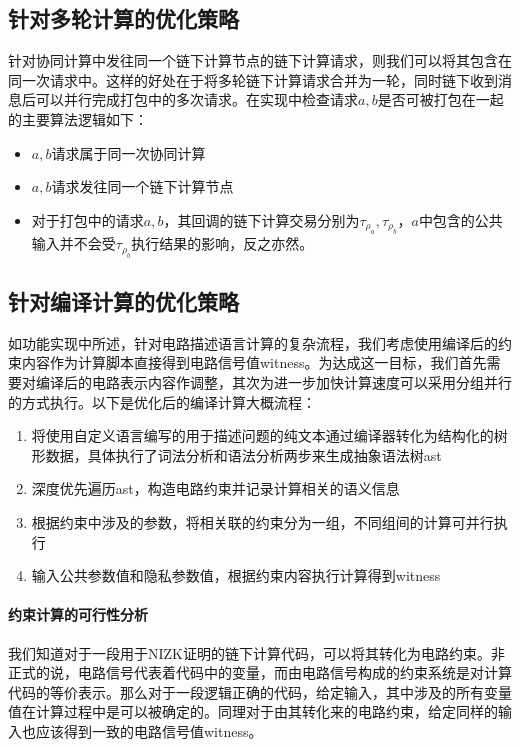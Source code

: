 \subsection{针对多轮计算的优化策略}
针对协同计算中发往同一个链下计算节点的链下计算请求，则我们可以将其包含在同一次请求中。这样的好处在于将多轮链下计算请求合并为一轮，同时链下收到消息后可以并行完成打包中的多次请求。在实现中检查请求$a,b$是否可被打包在一起的主要算法逻辑如下：
\begin{itemize}
    \setlength{\itemsep}{0pt}
    \setlength{\parsep}{0pt}
    \setlength{\parskip}{0pt}
    \item $a,b$请求属于同一次协同计算
    \item $a,b$请求发往同一个链下计算节点
    \item 对于打包中的请求$a, b$，其回调的链下计算交易分别为$\tau_{\rho_a}, \tau_{\rho_b}$，$a$中包含的公共输入并不会受$\tau_{\rho_b}$执行结果的影响，反之亦然。
\end{itemize}

\subsection{针对编译计算的优化策略}
如功能实现中所述，针对电路描述语言计算的复杂流程，我们考虑使用编译后的约束内容作为计算脚本直接得到电路信号值witness。为达成这一目标，我们首先需要对编译后的电路表示内容作调整，其次为进一步加快计算速度可以采用分组并行的方式执行。以下是优化后的编译计算大概流程：
\begin{enumerate}
    \setlength{\itemsep}{0pt}
    \setlength{\parsep}{0pt}
    \setlength{\parskip}{0pt}
    \item 将使用自定义语言编写的用于描述问题的纯文本通过编译器转化为结构化的树形数据，具体执行了词法分析和语法分析两步来生成抽象语法树ast
    \item 深度优先遍历ast，构造电路约束并记录计算相关的语义信息
    \item 根据约束中涉及的参数，将相关联的约束分为一组，不同组间的计算可并行执行
    \item 输入公共参数值和隐私参数值，根据约束内容执行计算得到witness
\end{enumerate}

\paragraph{约束计算的可行性分析} 我们知道对于一段用于NIZK证明的链下计算代码，可以将其转化为电路约束。非正式的说，电路信号代表着代码中的变量，而由电路信号构成的约束系统是对计算代码的等价表示。那么对于一段逻辑正确的代码，给定输入，其中涉及的所有变量值在计算过程中是可以被确定的。同理对于由其转化来的电路约束，给定同样的输入也应该得到一致的电路信号值witness。

